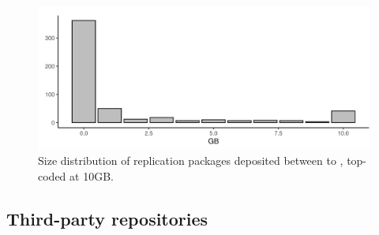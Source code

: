 \documentclass[PP]{AEA}
\newcommand{\aeadcr}{AEA Data and Code Repository}
\begin{document}
%
%
%



\begin{figure}[t]
    \centering
    \includegraphics[width=\textwidth]{images/plot_filesize_dist.png} 
    \caption{Size distribution of replication packages deposited between  \firstday{} to \lastday{}, top-coded at 10GB.}
    \label{fig:size_packages}
\end{figure}


\subsection{Third-party repositories}
\end{document}
